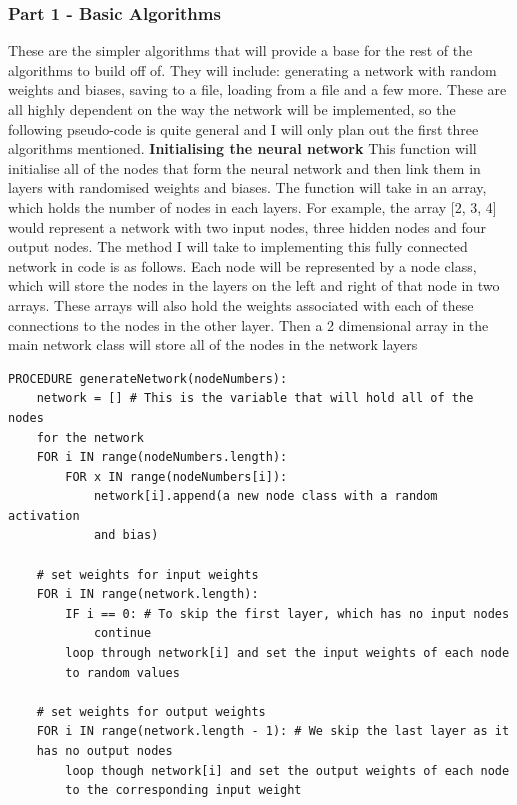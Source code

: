 \documentclass{report}
\begin{document}
\subsubsection{Part 1 - Basic Algorithms}
These are the simpler algorithms that will provide a base for the rest of the algorithms to build off of. They will include: generating a network with random weights and biases, saving to a file, loading from a file and a few more. These are all highly dependent on the way the network will be implemented, so the following pseudo-code is quite general and I will only plan out the first three algorithms mentioned.
\newline
\newline
\textbf{Initialising the neural network}
\newline
This function will initialise all of the nodes that form the neural network and then link them in layers with randomised weights and biases. The function will take in an array, which holds the number of nodes in each layers. For example, the array [2, 3, 4] would represent a network with two input nodes, three hidden nodes and four output nodes.
\newline
The method I will take to implementing this fully connected network in code is as follows. Each node will be represented by a node class, which will store the nodes in the layers on the left and right of that node in two arrays. These arrays will also hold the weights associated with each of these connections to the nodes in the other layer. Then a 2 dimensional array in the main network class will store all of the nodes in the network layers
\begin{verbatim}
PROCEDURE generateNetwork(nodeNumbers):
    network = [] # This is the variable that will hold all of the nodes
    for the network
    FOR i IN range(nodeNumbers.length):
        FOR x IN range(nodeNumbers[i]):
            network[i].append(a new node class with a random activation
            and bias)
    
    # set weights for input weights
    FOR i IN range(network.length):
        IF i == 0: # To skip the first layer, which has no input nodes
            continue
        loop through network[i] and set the input weights of each node 
        to random values
    
    # set weights for output weights
    FOR i IN range(network.length - 1): # We skip the last layer as it
    has no output nodes
        loop though network[i] and set the output weights of each node
        to the corresponding input weight
\end{verbatim}
\end{document}
